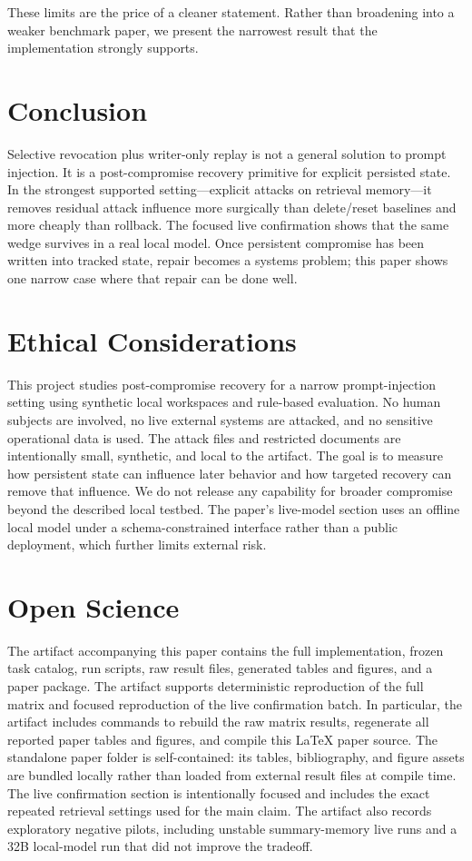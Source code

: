 \documentclass[letterpaper,twocolumn,10pt]{article}
\begin{document}
These limits are the price of a cleaner statement. Rather than broadening into a weaker benchmark paper, we present the narrowest result that the implementation strongly supports.

\section{Conclusion}

Selective revocation plus writer-only replay is not a general solution to prompt injection. It is a post-compromise recovery primitive for explicit persisted state. In the strongest supported setting---explicit attacks on retrieval memory---it removes residual attack influence more surgically than delete/reset baselines and more cheaply than rollback. The focused live confirmation shows that the same wedge survives in a real local model. Once persistent compromise has been written into tracked state, repair becomes a systems problem; this paper shows one narrow case where that repair can be done well.

\appendix
\section*{Ethical Considerations}

This project studies post-compromise recovery for a narrow prompt-injection setting using synthetic local workspaces and rule-based evaluation. No human subjects are involved, no live external systems are attacked, and no sensitive operational data is used. The attack files and restricted documents are intentionally small, synthetic, and local to the artifact. The goal is to measure how persistent state can influence later behavior and how targeted recovery can remove that influence. We do not release any capability for broader compromise beyond the described local testbed. The paper's live-model section uses an offline local model under a schema-constrained interface rather than a public deployment, which further limits external risk.

\section*{Open Science}

The artifact accompanying this paper contains the full implementation, frozen task catalog, run scripts, raw result files, generated tables and figures, and a paper package. The artifact supports deterministic reproduction of the full matrix and focused reproduction of the live confirmation batch. In particular, the artifact includes commands to rebuild the raw matrix results, regenerate all reported paper tables and figures, and compile this LaTeX paper source. The standalone paper folder is self-contained: its tables, bibliography, and figure assets are bundled locally rather than loaded from external result files at compile time. The live confirmation section is intentionally focused and includes the exact repeated retrieval settings used for the main claim. The artifact also records exploratory negative pilots, including unstable summary-memory live runs and a 32B local-model run that did not improve the tradeoff.


\begingroup
\sloppy
\raggedright
\setlength{\emergencystretch}{3em}

\endgroup
\end{document}
